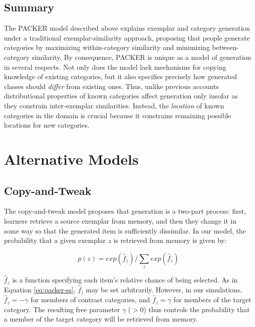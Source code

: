 \documentclass[10pt,letterpaper]{article}
\begin{document}
\subsection{Summary}

The PACKER model described above explains exemplar and category generation under a traditional exemplar-similarity approach, proposing that people generate categories by maximizing within-category similarity and minimizing between-category similarity. By consequence, PACKER is unique as a model of generation in several respects. Not only does the model lack mechanisms for copying knowledge of existing categories, but it also specifies precisely how generated classes should \textit{differ} from existing ones. Thus, unlike previous accounts distributional properties of known categories affect generation only insofar as they constrain inter-exemplar similarities. Instead, the \textit{location} of known categories in the domain is crucial because it constrains remaining possible locations for new categories.







\section{Alternative Models}

\subsection{Copy-and-Tweak}
The copy-and-tweak model proposes that generation is a two-part process: first, learners retrieve a source exemplar from memory, and then they change it in some way so that the generated item is sufficiently dissimilar. In our model, the probability that a given exemplar $z$ is retrieved from memory is given by: 

\begin{equation}
p(z) = exp(\hat{f}_z) / \sum_z{ exp(\hat{f}_z) }
\end{equation}

$\hat{f}_z$ is a function specifying each item's relative chance of being selected. As in Equation \ref{eq:packer-ss}, $\hat{f}_j$ may be set arbitrarily. However, in our simulations, $\hat{f}_z = -\gamma$ for members of contrast categories, and $\hat{f}_z = \gamma$ for members of the target category. The resulting free parameter $\gamma$ ($>0$) thus controls the probability that a member of the target category will be retrieved from memory.
\end{document}
